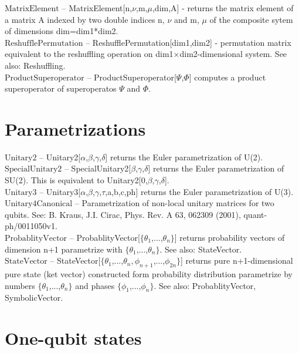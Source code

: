 \documentclass[a4paper,10pt]{scrartcl}
\begin{document}
\noindent\textbf{$ \text{MatrixElement} $ }-- MatrixElement[n,$\nu $,m,$\mu $,dim,A] - returns the matrix element of a matrix A indexed by two double indices n, $\nu $ and m, $\mu $ of the composite sytem of dimensions dim=dim1*dim2.$  $\\[8pt]
\noindent\textbf{$ \text{ReshufflePermutation} $ }-- ReshufflePermutation[dim1,dim2] - permutation matrix equivalent to the reshuffling operation on dim1$\times $dim2-dimensional system. See also: Reshuffling.$  $\\[8pt]
\noindent\textbf{$ \text{ProductSuperoperator} $ }-- ProductSuperoperator[$\Psi $,$\Phi $] computes a product superoperator of superoperatos $\Psi $ and $\Phi $.$  $\\[8pt]
\section{Parametrizations}

\noindent\textbf{$ \text{Unitary2} $ }-- Unitary2[$\alpha $,$\beta $,$\gamma $,$\delta $] returns the Euler parametrization of U(2).$  $\\[8pt]
\noindent\textbf{$ \text{SpecialUnitary2} $ }-- SpecialUnitary2[$\beta $,$\gamma $,$\delta $] returns the Euler parametrization of SU(2). This is equivalent to Unitary2[0,$\beta $,$\gamma $,$\delta $].$  $\\[8pt]
\noindent\textbf{$ \text{Unitary3} $ }-- Unitary3[$\alpha $,$\beta $,$\gamma $,$\tau $,a,b,c,ph] returns the Euler parametrization of U(3).$  $\\[8pt]
\noindent\textbf{$ \text{Unitary4Canonical} $ }-- Parametrization of non-local unitary matrices for two qubits. See: B. Kraus, J.I. Cirac, Phys. Rev. A 63, 062309 (2001), quant-ph/0011050v1.$  $\\[8pt]
\noindent\textbf{$ \text{ProbablityVector} $ }-- ProbablityVector[$\{$$ \theta _1 $,...,$ \theta _n $$\}$] returns probability vectors of dimension n+1 parametrize with $\{$$ \theta _1 $,...,$ \theta _n $$\}$. See also: StateVector.$  $\\[8pt]
\noindent\textbf{$ \text{StateVector} $ }-- StateVector[$\{$$ \theta _1 $,...,$ \theta _n,\phi _{n+1} $,...,$ \phi _{2 n} $$\}$] returns pure n+1-dimensional pure state (ket vector) constructed form probability distribution parametrize by numbers $\{$$ \theta _1 $,...,$ \theta _n $$\}$ and phases $\{$$ \phi _1 $,...,$ \phi _n $$\}$. See also: ProbablityVector, SymbolicVector.$  $\\[8pt]
\section{One-qubit states}
\end{document}
